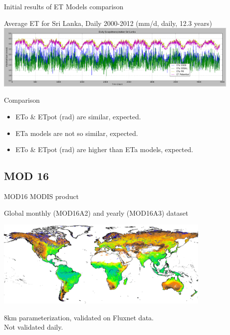 \documentclass[xcolor=dvipsnames,beamer]{beamer} %
\begin{document}
\begin{frame}[fragile]{Initial results of ET Models comparison}

\begin{center}
 Average ET for Sri Lanka, Daily 2000-2012 (mm/d, daily, 12.3 years)
 \includegraphics[width=12cm]{sltemporaletb}
\end{center}

\begin{block}{Comparison}
\begin{itemize}
 \item ETo \& ETpot (rad) are similar, expected.
 \item ETa models are not so similar, expected.
 \item ETo \& ETpot (rad) are higher than ETa models, expected.
\end{itemize}

\end{block}

\end{frame}

\subsection{MOD 16}
\begin{frame}[fragile]{MOD16 MODIS product}

Global monthly (MOD16A2) and yearly (MOD16A3) dataset
\begin{center}
 \includegraphics[width=10.5cm]{MOD16_2000.png}
\end{center}
8km parameterization, validated on Fluxnet data.\\
Not validated daily.
\end{frame}
\end{document}
